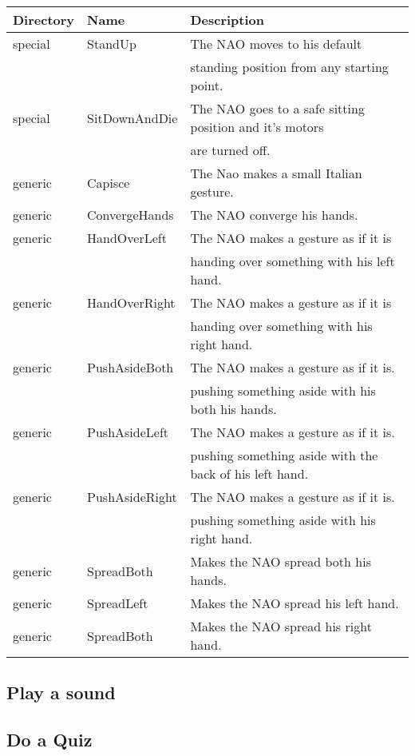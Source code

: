\begin{table}[h!]
\begin{tabular}{|l|l|l|}
\hline
\textbf{Directory} &\textbf{Name} &\textbf{Description} \\ 
\hline
special     &StandUp        &The NAO moves to his default \\
            &               &standing position from any starting point.  \\[0.4cm]

special     &SitDownAndDie  &The NAO goes to a safe sitting position and it's motors \\
            &               &are turned off. \\[0.2cm]
      
generic & Capisce & The Nao makes a small Italian gesture.  \\[0.4cm]
      
generic       &ConvergeHands       & The NAO converge his hands.  \\[0.4cm]

generic & HandOverLeft & The NAO makes a gesture as if it is  \\
&& handing over something with his left hand.  \\[0.4cm]
generic & HandOverRight & The NAO makes a gesture as if it is  \\
&& handing over something with his right hand.  \\[0.4cm]

generic & PushAsideBoth & The NAO makes a gesture as if it is. \\
&& pushing something aside with his both his hands.  \\[0.4cm]

generic & PushAsideLeft & The NAO makes a gesture as if it is.  \\
&& pushing something aside with the back of his left hand.  \\[0.4cm]

generic & PushAsideRight & The NAO makes a gesture as if it is. \\
&& pushing something aside with his right hand.  \\[0.4cm]

generic & SpreadBoth & Makes the NAO spread both his hands. \\[0.4cm]

generic & SpreadLeft & Makes the NAO spread his left hand. \\[0.4cm]

generic & SpreadBoth & Makes the NAO spread his right hand. \\[0.4cm]



\hline
\end{tabular}
\end{table}


\subsection{Play a sound}


\subsection{Do a Quiz}


